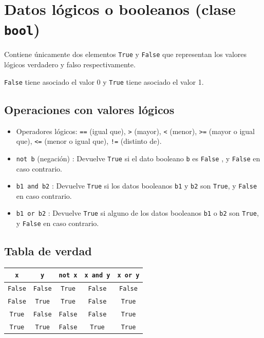 \documentclass[
  spanish,
  a4paper,
]{scrreport}
\newcounter{none} %
\providecommand{\tightlist}{%
  \setlength{\itemsep}{0pt}\setlength{\parskip}{0pt}}
\begin{document}
\section{\texorpdfstring{Datos lógicos o booleanos (clase
\texttt{bool})}{Datos lógicos o booleanos (clase bool)}}\label{datos-luxf3gicos-o-booleanos-clase-bool}

Contiene únicamente dos elementos \texttt{True} y \texttt{False} que
representan los valores lógicos verdadero y falso respectivamente.

\texttt{False} tiene asociado el valor 0 y \texttt{True} tiene asociado
el valor 1.

\subsection{Operaciones con valores
lógicos}\label{operaciones-con-valores-luxf3gicos}

\begin{itemize}
\tightlist
\item
  Operadores lógicos: \texttt{==} (igual que), \texttt{\textgreater{}}
  (mayor), \texttt{\textless{}} (menor), \texttt{\textgreater{}=} (mayor
  o igual que), \texttt{\textless{}=} (menor o igual que), \texttt{!=}
  (distinto de).
\item
  \texttt{not\ b} (negación) : Devuelve \texttt{True} si el dato
  booleano \texttt{b} es \texttt{False} , y \texttt{False} en caso
  contrario.
\item
  \texttt{b1\ and\ b2} : Devuelve \texttt{True} si los datos booleanos
  \texttt{b1} y \texttt{b2} son \texttt{True}, y \texttt{False} en caso
  contrario.
\item
  \texttt{b1\ or\ b2} : Devuelve \texttt{True} si alguno de los datos
  booleanos \texttt{b1} o \texttt{b2} son \texttt{True}, y
  \texttt{False} en caso contrario.
\end{itemize}

\subsection{Tabla de verdad}\label{tabla-de-verdad}

{\def\LTcaptype{none} %
\begin{longtable}[]{@{}ccccc@{}}
\toprule\noalign{}
\texttt{x} & \texttt{y} & \texttt{not\ x} & \texttt{x\ and\ y} &
\texttt{x\ or\ y} \\
\midrule\noalign{}
\endhead
\bottomrule\noalign{}
\endlastfoot
\texttt{False} & \texttt{False} & \texttt{True} & \texttt{False} &
\texttt{False} \\
\texttt{False} & \texttt{True} & \texttt{True} & \texttt{False} &
\texttt{True} \\
\texttt{True} & \texttt{False} & \texttt{False} & \texttt{False} &
\texttt{True} \\
\texttt{True} & \texttt{True} & \texttt{False} & \texttt{True} &
\texttt{True} \\
\end{longtable}
}
\end{document}
